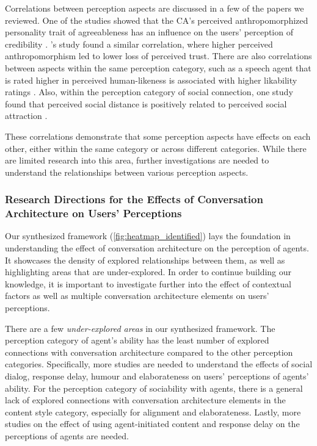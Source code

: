 Correlations between perception aspects are discussed in a few of the papers we reviewed. One of the studies showed that the CA's perceived anthropomorphized personality trait of agreeableness has an influence on the users' perception of credibility \cite{andrews2012system}\cmt{[38]}. \citet{seeger2021chatbots}\cmt{[35]}'s study found a similar correlation, where higher perceived anthropomorphism led to lower loss of perceived trust. There are also correlations between aspects within the same perception category, such as a speech agent that is rated higher in perceived human-likeness is associated with higher likability ratings \cite{zhu2022effects}\cmt{[26]}. Also, within the perception category of social connection, one study found that perceived social distance is positively related to perceived social attraction \cite{westerman2019believe}\cmt{[9]}.
 
These correlations demonstrate that some perception aspects have effects on each other, either within the same category or across different categories. While there are limited research into this area, further investigations are needed to understand the relationships between various perception aspects.


\subsubsection{Research Directions for the Effects of Conversation Architecture on Users' Perceptions}

Our synthesized framework (\autoref{fig:heatmap_identified}) lays the foundation in understanding the effect of conversation architecture on the perception of agents. It showcases the density of explored relationships between them, as well as highlighting areas that are under-explored. In order to continue building our knowledge, it is important to investigate further into the effect of contextual factors as well as multiple conversation architecture elements on users' perceptions.

There are a few \textit{under-explored areas} in our synthesized framework. The perception category of agent's ability has the least number of explored connections with conversation architecture compared to the other perception categories. Specifically, more studies are needed to understand the effects of social dialog, response delay, humour and elaborateness on users' perceptions of agents' ability. For the perception category of sociability with agents, there is a general lack of explored connections with conversation architecture elements in the content style category, especially for alignment and elaborateness. Lastly, more studies on the effect of using agent-initiated content and response delay on the perceptions of agents are needed.

